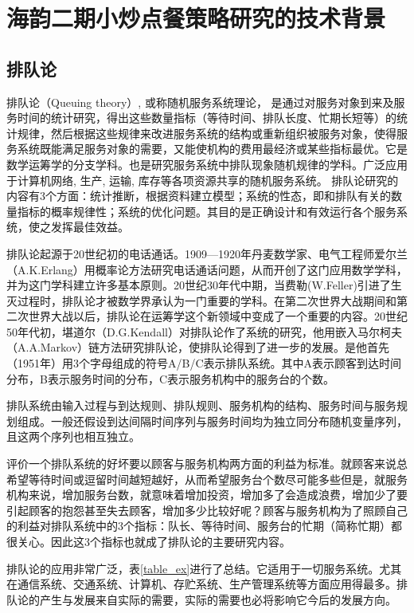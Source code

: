 \documentclass[a4paper,12pt]{book} %
\begin{document}
\chapter{海韵二期小炒点餐策略研究的技术背景}

\section{排队论}

排队论（Queuing theory）, 或称随机服务系统理论， 是通过对服务对象到来及服务时间的统计研究，得出这些数量指标（等待时间、排队长度、忙期长短等）的统计规律，然后根据这些规律来改进服务系统的结构或重新组织被服务对象，使得服务系统既能满足服务对象的需要，又能使机构的费用最经济或某些指标最优。它是数学运筹学的分支学科。也是研究服务系统中排队现象随机规律的学科。广泛应用于计算机网络, 生产, 运输, 库存等各项资源共享的随机服务系统。 排队论研究的内容有3个方面：统计推断，根据资料建立模型；系统的性态，即和排队有关的数量指标的概率规律性；系统的优化问题。其目的是正确设计和有效运行各个服务系统，使之发挥最佳效益。

排队论起源于20世纪初的电话通话。1909—1920年丹麦数学家、电气工程师爱尔兰（A.K.Erlang）用概率论方法研究电话通话问题，从而开创了这门应用数学学科，并为这门学科建立许多基本原则。20世纪30年代中期，当费勒(W.Feller)引进了生灭过程时，排队论才被数学界承认为一门重要的学科。在第二次世界大战期间和第二次世界大战以后，排队论在运筹学这个新领域中变成了一个重要的内容。20世纪50年代初，堪道尔（D.G.Kendall）对排队论作了系统的研究，他用嵌入马尔柯夫（A.A.Markov）链方法研究排队论，使排队论得到了进一步的发展。是他首先（1951年）用3个字母组成的符号A/B/C表示排队系统。其中A表示顾客到达时间分布，B表示服务时间的分布，C表示服务机构中的服务台的个数。

排队系统由输入过程与到达规则、排队规则、服务机构的结构、服务时间与服务规划组成。一般还假设到达间隔时间序列与服务时间均为独立同分布随机变量序列，且这两个序列也相互独立。

评价一个排队系统的好坏要以顾客与服务机构两方面的利益为标准。就顾客来说总希望等待时间或逗留时间越短越好，从而希望服务台个数尽可能多些但是，就服务机构来说，增加服务台数，就意味着增加投资，增加多了会造成浪费，增加少了要引起顾客的抱怨甚至失去顾客，增加多少比较好呢？顾客与服务机构为了照顾自己的利益对排队系统中的3个指标：队长、等待时间、服务台的忙期（简称忙期）都很关心。因此这3个指标也就成了排队论的主要研究内容。

排队论的应用非常广泛，表\ref{table_ex}进行了总结。它适用于一切服务系统。尤其在通信系统、交通系统、计算机、存贮系统、生产管理系统等方面应用得最多。排队论的产生与发展来自实际的需要，实际的需要也必将影响它今后的发展方向。
\end{document}
